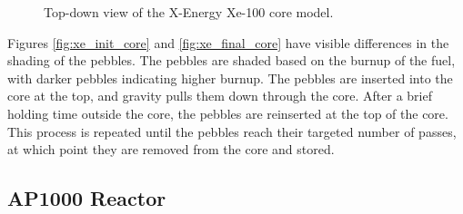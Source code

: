 \begin{figure}[H]
    \hfill
    \caption{Top-down view of the X-Energy Xe-100 core model.}
    \label{fig:xe_core}
  \end{figure}

Figures \ref{fig:xe_init_core} and \ref{fig:xe_final_core} have visible differences in the shading of the pebbles. The pebbles are shaded based on the burnup of the fuel, with darker pebbles indicating higher burnup. The pebbles are inserted into the core at the top, and gravity pulls them down through the core. After a brief holding time outside the core, the pebbles are reinserted at the top of the core. This process is repeated until the pebbles reach their targeted number of passes, at which point they are removed from the core and stored.

\subsection{AP1000 Reactor}
\label{sec:ap}

